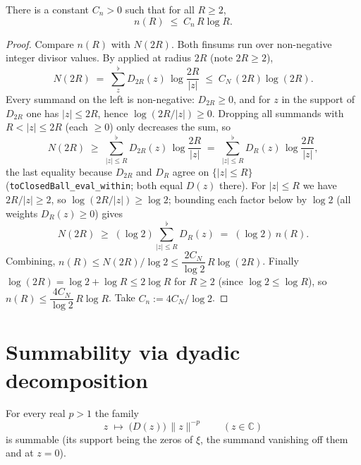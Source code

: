 \begin{lemma}
\label{lem:zs_count_bound}
\leanok
{}
There is a constant $C_n>0$ such that for all $R\ge2$,
\[
  n(R)\;\le\;C_n\,R\log R .
\]
\end{lemma}

\begin{proof}
\leanok
{}
Compare $n(R)$ with $N(2R)$. Both finsums run over non-negative integer divisor values.
By  applied at radius $2R$ (note $2R\ge2$),
\[
  N(2R)\;=\;\sum_{z}^{\flat} D_{2R}(z)\,\log\!\frac{2R}{|z|}\;\le\;C_N\,(2R)\log(2R).
\]
Every summand on the left is non-negative: $D_{2R}\ge0$, and for $z$ in the support of
$D_{2R}$ one has $|z|\le2R$, hence $\log(2R/|z|)\ge0$. Dropping all summands with
$R<|z|\le2R$ (each $\ge0$) only decreases the sum, so
\[
  N(2R)\;\ge\;\sum_{|z|\le R}^{\flat} D_{2R}(z)\,\log\!\frac{2R}{|z|}
         \;=\;\sum_{|z|\le R}^{\flat} D_R(z)\,\log\!\frac{2R}{|z|},
\]
the last equality because $D_{2R}$ and $D_R$ agree on $\{|z|\le R\}$
(\texttt{toClosedBall\_eval\_within}; both equal $D(z)$ there). For $|z|\le R$ we have
$2R/|z|\ge2$, so $\log(2R/|z|)\ge\log2$; bounding each factor below by $\log2$ (all
weights $D_R(z)\ge0$) gives
\[
  N(2R)\;\ge\;(\log2)\sum_{|z|\le R}^{\flat} D_R(z)\;=\;(\log2)\,n(R).
\]
Combining, $n(R)\le N(2R)/\log2\le \dfrac{2C_N}{\log2}\,R\log(2R)$. Finally
$\log(2R)=\log2+\log R\le 2\log R$ for $R\ge2$ (since $\log2\le\log R$), so
$n(R)\le\dfrac{4C_N}{\log2}\,R\log R$. Take $C_n:=4C_N/\log2$.
\end{proof}

\section{Summability via dyadic decomposition}
\label{sec:zs_summable}

\begin{lemma}
\label{lem:zs_summable_divisor}
\leanok
{}
For every real $p>1$ the family
\[
  z\;\longmapsto\;\bigl(D(z)\bigr)\,\|z\|^{-p}\qquad(z\in\mathbb C)
\]
is summable (its support being the zeros of $\xi$, the summand vanishing off them and at
$z=0$).
\end{lemma}

